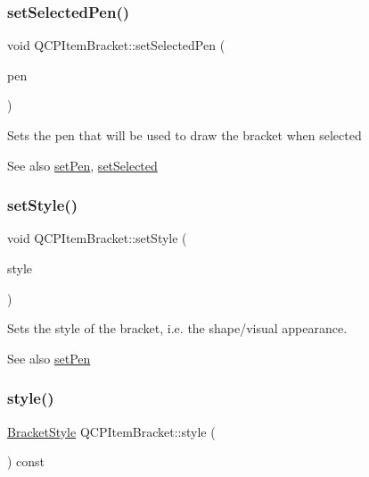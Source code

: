 \subsubsection{\texorpdfstring{setSelectedPen()}{setSelectedPen()}}
{\footnotesize\ttfamily void Q\+C\+P\+Item\+Bracket\+::set\+Selected\+Pen (\begin{DoxyParamCaption}\item[{const Q\+Pen \&}]{pen }\end{DoxyParamCaption})}

Sets the pen that will be used to draw the bracket when selected

\begin{DoxySeeAlso}{See also}
\mbox{\hyperlink{class_q_c_p_item_bracket_ab13001d9cc5d8f9e56ea15bdda682acb}{set\+Pen}}, \mbox{\hyperlink{class_q_c_p_abstract_item_a203de94ad586cc44d16c9565f49d3378}{set\+Selected}} 
\end{DoxySeeAlso}
\mbox{\label{class_q_c_p_item_bracket_a612dffa2373422eef8754d690add3703}} 
\subsubsection{\texorpdfstring{setStyle()}{setStyle()}}
{\footnotesize\ttfamily void Q\+C\+P\+Item\+Bracket\+::set\+Style (\begin{DoxyParamCaption}\item[{\mbox{\hyperlink{class_q_c_p_item_bracket_a7ac3afd0b24a607054e7212047d59dbd}{Q\+C\+P\+Item\+Bracket\+::\+Bracket\+Style}}}]{style }\end{DoxyParamCaption})}

Sets the style of the bracket, i.\+e. the shape/visual appearance.

\begin{DoxySeeAlso}{See also}
\mbox{\hyperlink{class_q_c_p_item_bracket_ab13001d9cc5d8f9e56ea15bdda682acb}{set\+Pen}} 
\end{DoxySeeAlso}
\mbox{\label{class_q_c_p_item_bracket_a600ad8c0a3193cc2f335db6039f2932d}} 
\subsubsection{\texorpdfstring{style()}{style()}}
{\footnotesize\ttfamily \mbox{\hyperlink{class_q_c_p_item_bracket_a7ac3afd0b24a607054e7212047d59dbd}{Bracket\+Style}} Q\+C\+P\+Item\+Bracket\+::style (\begin{DoxyParamCaption}{ }\end{DoxyParamCaption}) const\hspace{0.3cm}{\ttfamily [inline]}}



